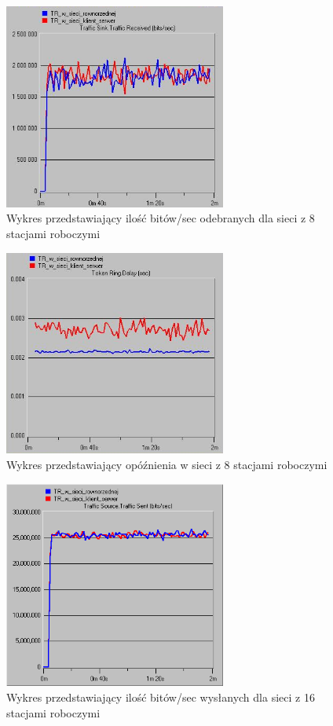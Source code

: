 \documentclass{article}
\begin{document}
\begin{figure}[H]
  \centering
  \includegraphics[width=0.65\textwidth]{screens/8_recv.png}
 \caption{Wykres przedstawiający ilość bitów/sec odebranych dla sieci z 8 stacjami roboczymi}
 \label{fig:8r}
\end{figure}

\begin{figure}[H]
  \centering
  \includegraphics[width=0.65\textwidth]{screens/8_delay.png}
 \caption{Wykres przedstawiający opóźnienia w sieci z 8 stacjami roboczymi}
 \label{fig:8d}
\end{figure}

\begin{figure}[H]
  \centering
  \includegraphics[width=0.65\textwidth]{screens/16_sent.png}
 \caption{Wykres przedstawiający ilość bitów/sec wysłanych dla sieci z 16 stacjami roboczymi}
 \label{fig:16s}
\end{figure}
\end{document}

